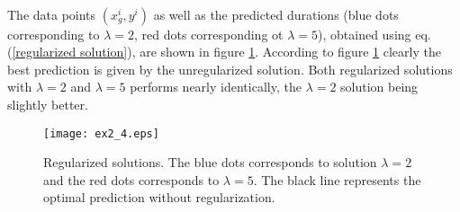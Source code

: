\documentclass[article,11pt]{article}
\begin{document}
\\
The data points $(x_g^i, y^i)$ as well as the predicted durations (blue dots
corresponding to $\lambda=2$, red dots corresponding ot $\lambda=5$), obtained
using eq. (\ref{regularized solution}), are shown in figure
\ref{fig:regularizedlinearregression}. According to figure
\ref{fig:regularizedlinearregression} clearly the best prediction is given by
the unregularized solution. Both regularized solutions with $\lambda=2$ and
$\lambda=5$ performs nearly identically, the $\lambda=2$ solution being slightly
better.
\begin{figure}[!h]
  \centering
  \texttt{[image: ex2\_4.eps]}
  \caption{Regularized solutions. The blue dots corresponds to solution $\lambda=2$ and the red dots corresponds to $\lambda=5$. The black line represents the
  optimal prediction without regularization.}
  \label{fig:regularizedlinearregression}
\end{figure}

\newpage
\end{document}
